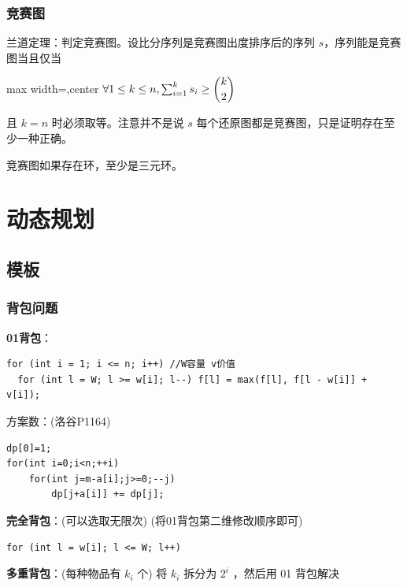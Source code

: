 \documentclass[twocolumn,10pt]{ctexart}
\begin{document}
\subsubsection{竞赛图}

兰道定理：判定竞赛图。设比分序列是竞赛图出度排序后的序列 $s$，序列能是竞赛图当且仅当

\begin{adjustbox}{max width=\linewidth,center}
$\forall1\le k\le n,\sum_{i=1}^ks_i\ge\dbinom k2$
\end{adjustbox}

且 $k=n$ 时必须取等。注意并不是说 $s$ 每个还原图都是竞赛图，只是证明存在至少一种正确。

竞赛图如果存在环，至少是三元环。

\section{动态规划}

\subsection{模板}

\subsubsection{背包问题}

\textbf{01背包}：

\begin{verbatim}
for (int i = 1; i <= n; i++) //W容量 v价值
  for (int l = W; l >= w[i]; l--) f[l] = max(f[l], f[l - w[i]] + v[i]);
\end{verbatim}

\begin{notebox}
方案数：(洛谷P1164)

\begin{verbatim}
dp[0]=1;
for(int i=0;i<n;++i)
    for(int j=m-a[i];j>=0;--j) 
        dp[j+a[i]] += dp[j];
\end{verbatim}
\end{notebox}

\textbf{完全背包}：(可以选取无限次) (将01背包第二维修改顺序即可)

\begin{verbatim}
for (int l = w[i]; l <= W; l++)
\end{verbatim}

\textbf{多重背包}：(每种物品有 $k_i$ 个) 将 $k_i$ 拆分为 $2^i$ ，然后用 01 背包解决
\end{document}
